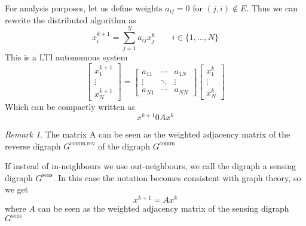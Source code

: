 \documentclass{book}
\theoremstyle{definition}
\theoremstyle{remark}
\newtheorem*{remark}{Remark}
\theoremstyle{remark}
\theoremstyle{definition}
\begin{document}
For analysis purposes, let us define weights $a_{ij}=0$ for $(j,i)\notin E$. Thus we can rewrite the distributed algorithm as 
\[
    x_i^{k+1}=\displaystyle\sum_{j=1}^{N}a_{ij}x_j^k \qquad i\in\{1,\dots,N\}
\]
This is a LTI autonomous system 
\[
    \begin{bmatrix}
        x_1^{k+1}\\ \vdots \\ x_N^{k+1}
    \end{bmatrix} = \begin{bmatrix}
        a_{11} & \cdots & a_{1N} \\ 
        \vdots & \ddots & \vdots \\
        a_{N1} & \cdots & a_{NN}
    \end{bmatrix} \begin{bmatrix}
        x_1^k \\ \vdots \\ x_N^k
    \end{bmatrix}
\]
Which can be compactly written as  
\[
    x^{k+1} 0 Ax^k
\]
\begin{remark}
    The matrix A can be seen as the weighted adjacency matrix of the reverse digraph $G^{\text{comm,rev}}$ of the digraph $G^{\text{comm}}$
\end{remark}
If instead of in-neighbours we use out-neighbours, we call the digraph a sensing digraph $G^{\text{sens}}$. In this case the notation becomes consistent with graph theory, so we get 
\[
    x^{k+1} = A x^k
\]
where $A$ can be seen as the weighted adjacency matrix of the sensing digraph $G^{\text{sens}}$
\end{document}
